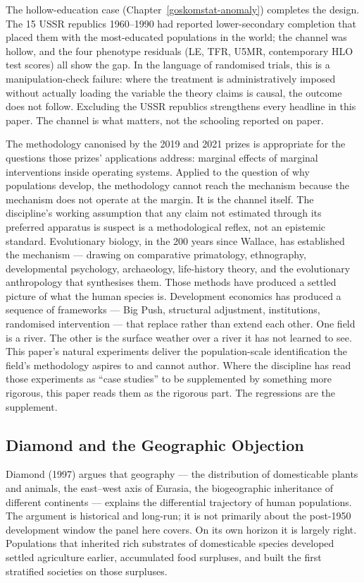 \documentclass[12pt,letterpaper]{article}
\begin{document}
{The hollow-education case (Chapter~\ref{goskomstat-anomaly}) completes
the design. The 15 USSR republics 1960--1990 had reported
lower-secondary completion that placed them with the most-educated
populations in the world; the channel was hollow, and the four
phenotype residuals (LE, TFR, U5MR, contemporary HLO test scores) all
show the gap. In the language of randomised trials, this is a
manipulation-check failure: where the treatment is administratively
imposed without actually loading the variable the theory claims is
causal, the outcome does not follow. Excluding the USSR republics
strengthens every headline in this paper. The channel is what
matters, not the schooling reported on paper.

The methodology canonised by the 2019 and 2021 prizes is appropriate
for the questions those prizes' applications address: marginal effects
of marginal interventions inside operating systems. Applied to the
question of why populations develop, the methodology cannot reach the
mechanism because the mechanism does not operate at the margin. It is
the channel itself. The discipline's working assumption that any claim
not estimated through its preferred apparatus is suspect is a
methodological reflex, not an epistemic standard. Evolutionary biology, in the 200 years since Wallace,
has established the mechanism --- drawing on comparative primatology,
ethnography, developmental psychology, archaeology, life-history
theory, and the evolutionary anthropology that synthesises them.
Those methods have produced a settled picture of what the human
species is. Development economics has produced a
sequence of frameworks --- Big Push, structural adjustment,
institutions, randomised intervention --- that replace rather than
extend each other. One field is a river. The other is the surface
weather over a river it has not learned to see. This paper's natural
experiments deliver the population-scale identification the field's
methodology aspires to and cannot author. Where the discipline has
read those experiments as ``case studies'' to be supplemented by
something more rigorous, this paper reads them as the rigorous part.
The regressions are the supplement.

\subsection{Diamond and the Geographic Objection}\label{diamond-geographic-objection}

Diamond (1997) argues that geography --- the distribution of domesticable plants and animals, the east--west axis of Eurasia, the biogeographic inheritance of different continents --- explains the differential trajectory of human populations. The argument is historical and long-run; it is not primarily about the post-1950 development window the panel here covers. On its own horizon it is largely right. Populations that inherited rich substrates of domesticable species developed settled agriculture earlier, accumulated food surpluses, and built the first stratified societies on those surpluses.

}
\end{document}
